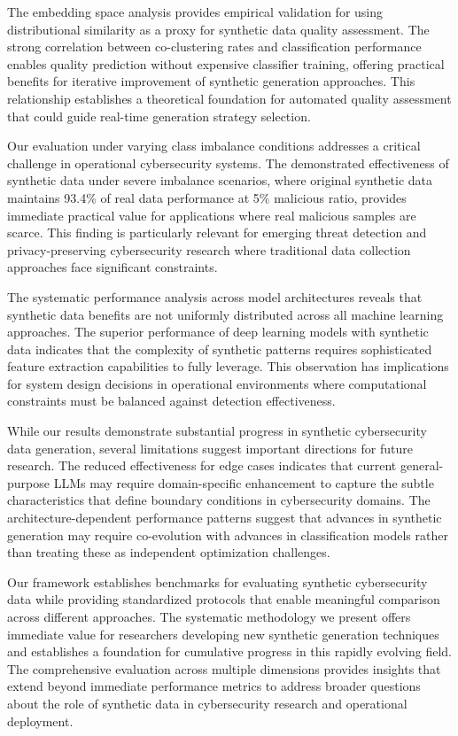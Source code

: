 The embedding space analysis provides empirical validation for using distributional similarity as a proxy for synthetic data quality assessment. The strong correlation between co-clustering rates and classification performance enables quality prediction without expensive classifier training, offering practical benefits for iterative improvement of synthetic generation approaches. This relationship establishes a theoretical foundation for automated quality assessment that could guide real-time generation strategy selection.

Our evaluation under varying class imbalance conditions addresses a critical challenge in operational cybersecurity systems. The demonstrated effectiveness of synthetic data under severe imbalance scenarios, where original synthetic data maintains 93.4\% of real data performance at 5\% malicious ratio, provides immediate practical value for applications where real malicious samples are scarce. This finding is particularly relevant for emerging threat detection and privacy-preserving cybersecurity research where traditional data collection approaches face significant constraints.

The systematic performance analysis across model architectures reveals that synthetic data benefits are not uniformly distributed across all machine learning approaches. The superior performance of deep learning models with synthetic data indicates that the complexity of synthetic patterns requires sophisticated feature extraction capabilities to fully leverage. This observation has implications for system design decisions in operational environments where computational constraints must be balanced against detection effectiveness.

While our results demonstrate substantial progress in synthetic cybersecurity data generation, several limitations suggest important directions for future research. The reduced effectiveness for edge cases indicates that current general-purpose LLMs may require domain-specific enhancement to capture the subtle characteristics that define boundary conditions in cybersecurity domains. The architecture-dependent performance patterns suggest that advances in synthetic generation may require co-evolution with advances in classification models rather than treating these as independent optimization challenges.

Our framework establishes benchmarks for evaluating synthetic cybersecurity data while providing standardized protocols that enable meaningful comparison across different approaches. The systematic methodology we present offers immediate value for researchers developing new synthetic generation techniques and establishes a foundation for cumulative progress in this rapidly evolving field. The comprehensive evaluation across multiple dimensions provides insights that extend beyond immediate performance metrics to address broader questions about the role of synthetic data in cybersecurity research and operational deployment.

